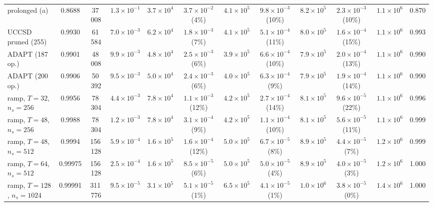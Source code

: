 \documentclass[a4paper,11pt,noarxiv]{quantumarticle}
\begin{document}
\begin{table}[t]
{\begin{tabular}{lcc|cc|cc|cc|ccc}
  prolonged (a) & 0.8688 & 37\,008 & $1.3{\times}10^{-1}$ & $3.7{\times}10^{4}$ & $3.7{\times}10^{-2}$ (4\%) & $4.1{\times}10^{5}$ & $9.8{\times}10^{-3}$ (10\%) & $8.2{\times}10^{5}$ & $2.3{\times}10^{-3}$ (10\%) & $1.1{\times}10^{6}$ & 0.870\\
  UCCSD pruned (255) & 0.9930 & 61\,584 & $7.0{\times}10^{-3}$ & $6.2{\times}10^{4}$ & $1.8{\times}10^{-3}$ (7\%) & $4.1{\times}10^{5}$ & $5.1{\times}10^{-4}$ (11\%) & $8.0{\times}10^{5}$ & $1.6{\times}10^{-4}$ (15\%) & $1.1{\times}10^{6}$ & 0.993\\
  ADAPT (187 op.) & 0.9901 & 48\,008 & $9.9{\times}10^{-3}$ & $4.8{\times}10^{4}$ & $2.5{\times}10^{-3}$ (6\%) & $3.9{\times}10^{5}$ & $6.6{\times}10^{-4}$ (10\%) & $7.9{\times}10^{5}$ & $2.0{\times}10^{-4}$ (13\%) & $1.1{\times}10^{6}$ & 0.990\\
  ADAPT (200 op.) & 0.9906 & 50\,392 & $9.5{\times}10^{-3}$ & $5.0{\times}10^{4}$ & $2.4{\times}10^{-3}$ (6\%) & $4.0{\times}10^{5}$ & $6.3{\times}10^{-4}$ (9\%) & $7.9{\times}10^{5}$ & $1.9{\times}10^{-4}$ (14\%) & $1.1{\times}10^{6}$ & 0.990\\
  ramp, $T=32$, $n_s=256$ & 0.9956 & 78\,304 & $4.4{\times}10^{-3}$ & $7.8{\times}10^{4}$ & $1.1{\times}10^{-3}$ (12\%) & $4.2{\times}10^{5}$ & $2.7{\times}10^{-4}$ (14\%) & $8.1{\times}10^{5}$ & $9.6{\times}10^{-5}$ (22\%) & $1.1{\times}10^{6}$ & 0.996\\
  ramp, $T=48$, $n_s=256$ & 0.9988 & 78\,304 & $1.2{\times}10^{-3}$ & $7.8{\times}10^{4}$ & $3.1{\times}10^{-4}$ (9\%) & $4.2{\times}10^{5}$ & $1.1{\times}10^{-4}$ (10\%) & $8.1{\times}10^{5}$ & $5.6{\times}10^{-5}$ (11\%) & $1.1{\times}10^{6}$ & 0.999\\
  ramp, $T=48$, $n_s=512$ & 0.9994 & 156\,128 & $5.9{\times}10^{-4}$ & $1.6{\times}10^{5}$ & $1.6{\times}10^{-4}$ (12\%) & $5.0{\times}10^{5}$ & $6.7{\times}10^{-5}$ (8\%) & $8.9{\times}10^{5}$ & $4.4{\times}10^{-5}$ (7\%) & $1.2{\times}10^{6}$ & 0.999\\
  ramp, $T=64$, $n_s=512$ & 0.99975 & 156\,128 & $2.5{\times}10^{-4}$ & $1.6{\times}10^{5}$ & $8.5{\times}10^{-5}$ (6\%) & $5.0{\times}10^{5}$ & $5.0{\times}10^{-5}$ (4\%) & $8.9{\times}10^{5}$ & $4.0{\times}10^{-5}$ (3\%) & $1.2{\times}10^{6}$ & 1.000\\
  ramp, $T=128$, $n_s=1024$ & 0.99991 & 311\,776 & $9.5{\times}10^{-5}$ & $3.1{\times}10^{5}$ & $5.1{\times}10^{-5}$ (1\%) & $6.5{\times}10^{5}$ & $4.1{\times}10^{-5}$ (1\%) & $1.0{\times}10^{6}$ & $3.8{\times}10^{-5}$ (0\%) & $1.4{\times}10^{6}$ & 1.000\\

\end{tabular}}
\end{table}
\end{document}
